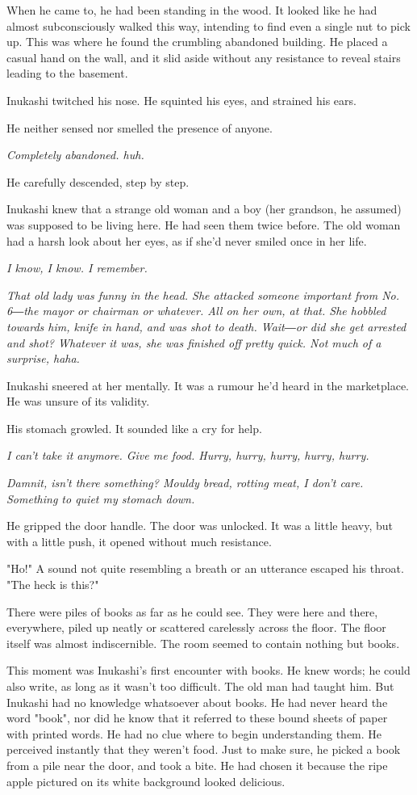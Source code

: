 When he came to, he had been standing in the wood. It looked like he had
almost subconsciously walked this way, intending to find even a single
nut to pick up. This was where he found the crumbling abandoned
building. He placed a casual hand on the wall, and it slid aside without
any resistance to reveal stairs leading to the basement.

Inukashi twitched his nose. He squinted his eyes, and strained his ears.

He neither sensed nor smelled the presence of anyone.

\emph{Completely abandoned. huh.}

He carefully descended, step by step.

Inukashi knew that a strange old woman and a boy (her grandson, he
assumed) was supposed to be living here. He had seen them twice before.
The old woman had a harsh look about her eyes, as if she'd never smiled
once in her life.

\emph{I know, I know. I remember.}

\emph{That old lady was funny in the head. She attacked someone important from
No. 6―the mayor or chairman or whatever. All on her own, at that. She
hobbled towards him, knife in hand, and was shot to death. Wait―or did
she get arrested and shot? Whatever it was, she was finished off pretty
quick. Not much of a surprise, haha.}

Inukashi sneered at her mentally. It was a rumour he'd heard in the
marketplace. He was unsure of its validity.

His stomach growled. It sounded like a cry for help.

\emph{I can't take it anymore. Give me food. Hurry, hurry, hurry, hurry,
hurry.}

\emph{Damnit, isn't there something? Mouldy bread, rotting meat, I don't care.
Something to quiet my stomach down.}

He gripped the door handle. The door was unlocked. It was a little
heavy, but with a little push, it opened without much resistance.

"Ho!" A sound not quite resembling a breath or an utterance escaped his
throat. "The heck is this?"

There were piles of books as far as he could see. They were here and
there, everywhere, piled up neatly or scattered carelessly across the
floor. The floor itself was almost indiscernible. The room seemed to
contain nothing but books.

This moment was Inukashi's first encounter with books. He knew words; he
could also write, as long as it wasn't too difficult. The old man had
taught him. But Inukashi had no knowledge whatsoever about books. He had
never heard the word "book", nor did he know that it referred to these
bound sheets of paper with printed words. He had no clue where to begin
understanding them. He perceived instantly that they weren't food. Just
to make sure, he picked a book from a pile near the door, and took a
bite. He had chosen it because the ripe apple pictured on its white
background looked delicious.


